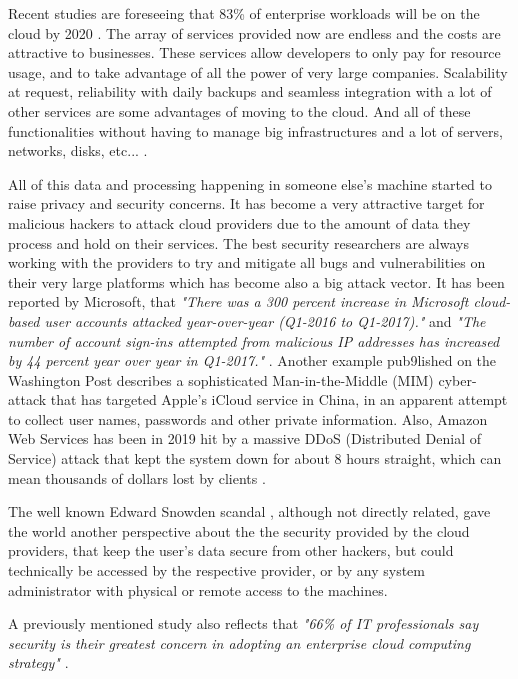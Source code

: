 Recent studies are foreseeing that 83{\%} of enterprise workloads will be on the cloud by 2020 \cite{cloud_statistic:1}. The array of services provided now are endless and the costs are attractive to businesses. These services allow developers to only pay for resource usage, and to take advantage of all the power of very large companies. Scalability at request, reliability with daily backups and seamless integration with a lot of other services are some advantages of moving to the cloud. And all of these functionalities without having to manage big infrastructures and a lot of servers, networks, disks, etc... \cite{cloud_benefits:1}.

All of this data and processing happening in someone else's machine started to raise privacy and security concerns. It has become a very attractive target for malicious hackers to attack cloud providers due to the amount of data they process and hold on their services. The best security researchers are always working with the providers to try and mitigate all bugs and vulnerabilities on their very large platforms which has become also a big attack vector. It has been reported by Microsoft, that \textit{"There was a 300 percent increase in Microsoft cloud-based user accounts attacked year-over-year (Q1-2016 to Q1-2017)."} and \textit{"The number of account sign-ins attempted from malicious IP addresses has increased by 44 percent year over year in Q1-2017."} \cite{cloud_attacks:1}. Another example pub9lished on the Washington Post describes a sophisticated Man-in-the-Middle (\gls{MIM}) cyber-attack that has targeted Apple’s iCloud service in China, in an apparent attempt to collect user names, passwords and other private information. Also, Amazon Web Services has been in 2019 hit by a massive \gls{DDoS} (Distributed Denial of Service) attack that kept the system down for about 8 hours straight, which can mean thousands of dollars lost by clients \cite{cloud_attacks:3}.

The well known Edward Snowden scandal \cite{snowden:1}, although not directly related, gave the world another perspective about the the security provided by the cloud providers, that keep the user's data secure from other hackers, but could technically be accessed by the respective provider, or by any system administrator with physical or remote access to the machines.

A previously mentioned study also reflects that \textit{"66{\%} of IT professionals say security is their greatest concern in adopting an enterprise cloud computing strategy"} \cite{cloud_statistic:1}.

